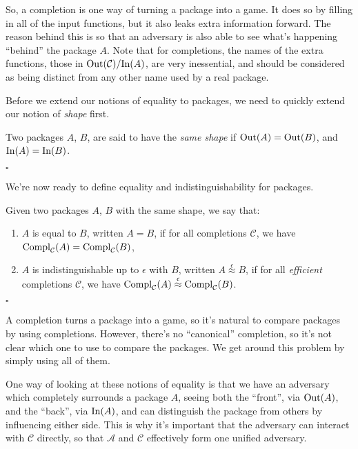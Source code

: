 So, a completion is one way of turning a package into a game.
It does so by filling in all of the input functions,
but it also leaks extra information forward.
The reason behind this is so that an adversary is also able
to see what's happening ``behind'' the package $A$.
Note that for completions, the names of the extra
functions, those in $\text{Out}(\mathcal{C}) / \text{In}(A)$,
are very inessential, and should be considered
as being distinct from any other name used by a real package.

Before we extend our notions of equality to packages, we need
to quickly extend our notion of \emph{shape} first.

\begin{definition}
    Two packages $A$, $B$, are said to have the \emph{same shape}
    if $\text{Out}(A) = \text{Out}(B)$, and $\text{In}(A) = \text{In}(B)$.

    $\square$
\end{definition}

We're now ready to define equality and indistinguishability for packages.

\begin{definition}
    Given two packages $A$, $B$ with the same shape, we say that:
    \begin{enumerate}
        \item $A$ is equal to $B$, written $A = B$, if for all completions
        $\mathcal{C}$, we have $\text{Compl}_{\mathcal{C}}(A) = \text{Compl}_{\mathcal{C}}(B)$,
        \item $A$ is indistinguishable up to $\epsilon$ with $B$, written $A \overset{\epsilon}{\approx} B$,
        if for all \emph{efficient} completions $\mathcal{C}$, we have $\text{Compl}_{\mathcal{C}}(A) \overset{\epsilon}{\approx} \text{Compl}_{\mathcal{C}}(B)$.
    \end{enumerate}

    $\square$
\end{definition}

A completion turns a package into a game, so it's natural to compare
packages by using completions.
However, there's no ``canonical'' completion, so it's not clear
which one to use to compare the packages.
We get around this problem by simply using all of them.

One way of looking at these notions of equality is that we
have an adversary which completely surrounds a package $A$,
seeing both the ``front'', via $\text{Out}(A)$, and the ``back'',
via $\text{In}(A)$, and can distinguish the package from others by influencing
either side.
This is why it's important that the adversary can interact with $\mathcal{C}$
directly, so that $\mathcal{A}$ and $\mathcal{C}$ effectively form
one unified adversary.

